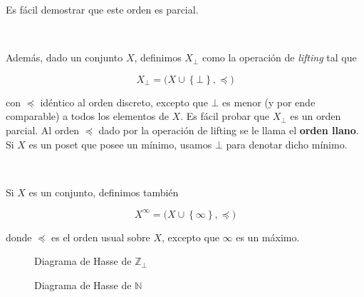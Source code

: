 \documentclass[a4paper, 12pt]{article}
\begin{document}
Es fácil demostrar que este orden es parcial. 

~ 

Además, dado un conjunto $X$, definimos $X_\bot $ como la operación de
\textit{lifting} tal que 

\begin{equation*}
  X_\bot = \Big( X \cup \left\{ \bot  \right\}, \preceq  \Big)
\end{equation*}

con $\preceq$ idéntico al orden discreto, excepto que $\bot$ es menor (y por
ende comparable) a todos los elementos de $X$. Es fácil probar que $X_\bot $ es
un orden parcial. Al orden $\preceq$ dado por la operación de lifting se le
llama el \textbf{orden llano}. Si $X$ es un poset que posee un mínimo, usamos
$\bot $ para denotar dicho mínimo.

~ 

Si $X$ es un conjunto, definimos también 

\begin{equation*}
  X^\infty = \Big( X \cup \left\{ \infty \right\}, \preceq \Big)
\end{equation*}

donde $\preceq$ es el orden usual sobre $X$, excepto que $\infty$ es un máximo.


\begin{figure}[!h]
\centering
{}
\caption{Diagrama de Hasse de $\mathbb{Z}_\bot $}
\end{figure} 


\begin{figure}[!h]
\centering
{}
\caption{Diagrama de Hasse de $\mathbb{N}$}
\end{figure} 
\end{document}
